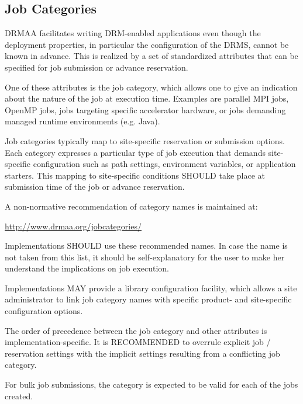 \documentclass{article}
\newcommand{\rat}[1]{}
\begin{document}
\subsection{Job Categories}
\label{sec:jobcategories}

DRMAA facilitates writing DRM-enabled applications even though the deployment properties, in particular the configuration of the DRMS, cannot be known in advance. This is realized by a set of standardized attributes that can be specified for job submission or advance reservation.

One of these attributes is the job category, which allows one to give an indication about the nature of the job at execution time. Examples are parallel MPI jobs, OpenMP jobs, jobs targeting specific accelerator hardware, or jobs demanding managed runtime environments (e.g. Java). 

Job categories typically map to site-specific reservation or submission options. Each category expresses a particular type of job execution that demands site-specific configuration such as path settings, environment variables, or application starters. This mapping to site-specific conditions SHOULD take place at submission time of the job or advance reservation.

A non-normative recommendation of category names is maintained at:

\url{http://www.drmaa.org/jobcategories/}

Implementations SHOULD use these recommended names. In case the name is not taken from this list, it should be self-explanatory for the user to make her understand the implications on job execution. 

Implementations MAY provide a library configuration facility, which allows a site administrator to link job category names with specific product- and site-specific configuration options.

The order of precedence between the job category and other attributes is implementation-specific. It is RECOMMENDED to overrule explicit job / reservation settings with the implicit settings resulting from a conflicting job category.

For bulk job submissions, the category is expected to be valid for each of the jobs created.

\rat{There was a discussion on supporting the specification of multiple categories at the same time. Since this would put more burden on the implementation in terms of conflict resolving, we avoided that intentionally. This allows to map categories simply to some additional job submission command line arguments, similar to the old nativeSpecification thing.}
\end{document}
